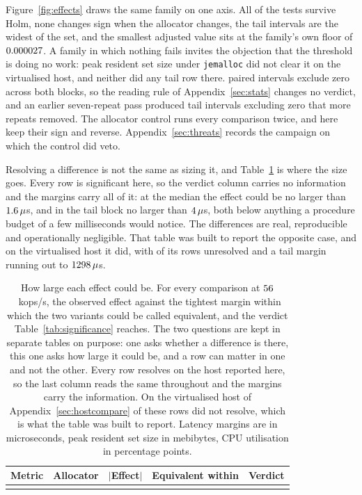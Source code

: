 \documentclass[english,oneside,a4paper,censored,csm,software-track-2020]{HYthesisML}
\begin{document}
Figure~\ref{fig:effects} draws the same family on one axis. All \NSignificant{} of the \NTests{}
tests survive Holm, none changes sign when the allocator changes, the tail intervals are the
widest of the set, and the smallest adjusted value sits at the family's own floor of
$0.000027$. A family in which nothing fails invites the objection that the threshold is
doing no work: peak resident set size under \texttt{jemalloc} did not clear it on the virtualised
host, and neither did any tail row there. \NExclZero{} paired intervals exclude zero across both
blocks, so the reading rule of Appendix~\ref{sec:stats} changes no verdict, and an earlier
seven-repeat pass produced tail intervals excluding zero that more repeats removed. The allocator
control runs every comparison twice, and here \CrossAllocConsistent{} keep their sign and
\NCrossAllocReversed{} reverse. Appendix~\ref{sec:threats} records the campaign on which the
control did veto.

Resolving a difference is not the same as sizing it, and Table~\ref{tab:equivalence} is where the
size goes. Every row is significant here, so the verdict column carries no information and the
margins carry all of it: at the median the effect could be no larger than
$1.6\,\mu$s, and in the tail block no larger than $4\,\mu$s, both
below anything a procedure budget of a few milliseconds would notice. The differences are real,
reproducible and operationally negligible. That table was built to report the opposite case, and
on the virtualised host it did, with \GuestNEqvUnresolved{} of its \GuestNEqvRows{} rows
unresolved and a tail margin running out to $1298\,\mu$s.

\begin{table}[tp]
\centering
\small
\caption[How large each effect could be]{How large each effect could be. For every comparison at
$56$~kops/s, the observed effect against the tightest margin within which the two variants
could be called equivalent, and the verdict Table~\ref{tab:significance} reaches. The two
questions are kept in separate tables on purpose: one asks whether a difference is there, this
one asks how large it could be, and a row can matter in one and not the other. Every row resolves
on the host reported here, so the last column reads the same throughout and the margins carry the
information. On the virtualised host of Appendix~\ref{sec:hostcompare}
\GuestNEqvUnresolved{} of these rows did not resolve, which is what the table was built to
report. Latency margins are in microseconds, peak resident set size in mebibytes, CPU utilisation
in percentage points.\label{tab:equivalence}}
\begin{tabular}{@{}l l r r l@{}}
\hline\hline
Metric & Allocator & $|$Effect$|$ & Equivalent within & Verdict \\
\hline
\\
\hline
\end{tabular}
\end{table}
\end{document}
